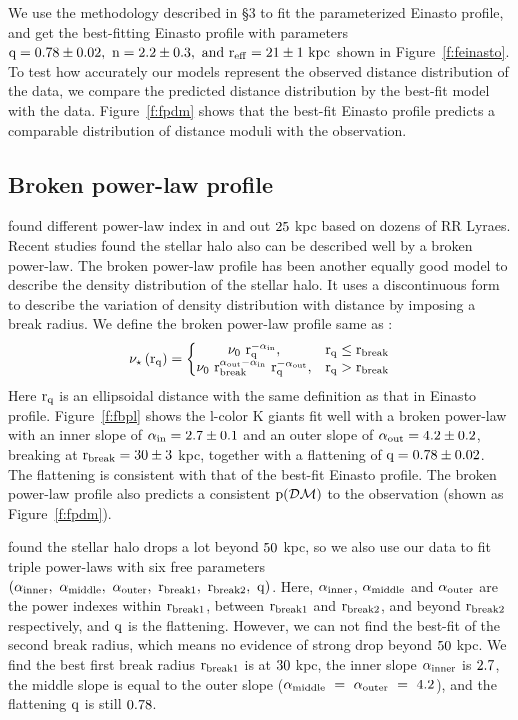 \documentclass[12pt,preprint]{aastex}
\newcommand{\DM}{\mathcal{DM}}
\begin{document}
We use the methodology described in \S 3 to fit the parameterized Einasto profile, and get the best-fitting Einasto profile with parameters $\rm q=0.78\pm0.02,~n=2.2\pm0.3,~and ~r_{eff}=21\pm1~kpc$ shown in Figure~\ref{f:feinasto}. To test how accurately our models represent the observed distance distribution of the data, we compare the predicted distance distribution by the best-fit model with the data. Figure~\ref{f:fpdm} shows that the best-fit Einasto profile predicts a comparable distribution of distance moduli with the observation. 

\subsection{Broken power-law profile}
\citet{Saha1985} found different power-law index in and out $\rm 25~$kpc based on dozens of RR Lyraes. Recent studies\citep{Sesar2011,Deason2011,Deason2014} found the stellar halo also can be described well by a broken power-law. The broken power-law profile has been another equally good model to describe the density distribution of the stellar halo. It uses a discontinuous form to describe the variation of density distribution with distance by imposing a break radius. We define the broken power-law profile same as \citet{Deason2011}:
\begin{equation}
\rm \nu_\star\left(r_q \right )= \left\{\begin{matrix} \rm \nu_0~r_q^{-\alpha_{in}}, & \rm r_q\leq r_{break} \\ \rm \nu_0~r_{break}^{\alpha_{out}-\alpha_{in}}~r_q^{-\alpha_{out}},&\rm r_q>r_{break} \end{matrix}\right.
\end{equation}
Here $\rm r_q$ is an ellipsoidal distance with the same definition as that in Einasto profile. Figure~\ref{f:fbpl} shows the l-color K giants fit well with a broken power-law with an inner slope of $\rm \alpha_{in}=2.7\pm0.1$ and an outer slope of $\rm \alpha_{out}=4.2\pm0.2$, breaking at $\rm r_{break}=30\pm3~$kpc, together with a flattening of $\rm q=0.78\pm0.02$. The flattening is consistent with that of the best-fit Einasto profile. The broken power-law profile also predicts a consistent $\rm p(\DM)$ to the observation (shown as Figure~\ref{f:fpdm}).

\citet{Deason2014} found the stellar halo drops a lot beyond $\rm 50~$kpc, so we also use our data to fit triple power-laws with six free parameters $\rm \left(\alpha_{inner},~\alpha_{middle},~\alpha_{outer},~r_{break1},~r_{break2},~q\right)$. Here, $\rm \alpha_{inner}$, $\rm \alpha_{middle}$ and $\rm \alpha_{outer}$ are the power indexes within $\rm r_{break1}$, between $\rm r_{break1}$ and $\rm r_{break2}$, and beyond $\rm r_{break2}$ respectively, and $\rm q$ is the flattening. However, we can not find the best-fit of the second break radius, which means no evidence of strong drop beyond $\rm 50~$kpc. We find the best first break radius $\rm r_{break1}$ is at $\rm 30~$kpc, the inner slope $\rm \alpha_{inner}$ is $\rm 2.7$, the middle slope is equal to the outer slope ($\rm \alpha_{middle}~=~ \alpha_{outer}~=~4.2$), and the flattening $\rm q$ is still $\rm 0.78$.
    
\end{document}
